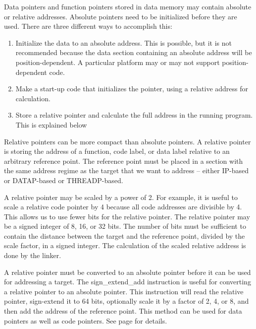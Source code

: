 \documentclass[forwardcom.tex]{subfiles}
\begin{document}
Data pointers and function pointers stored in data memory may contain absolute or relative addresses. 
Absolute pointers need to be initialized before they are used. There are three different ways to accomplish this:
\begin{enumerate}
  \item Initialize the data to an absolute address. This is possible, but it is not recommended because the data section containing an absolute address will be position-dependent. A particular platform may or may not support position-dependent code.
  
  \item Make a start-up code that initializes the pointer, using a relative address for calculation.
        
  \item Store a relative pointer and calculate the full address in the running
        program. This is explained below
  
\end{enumerate}
\vspace{4mm}


Relative pointers can be more compact than absolute pointers. 
A relative pointer is storing the address of a function, code label, or data label relative to an arbitrary reference point. The reference point must be placed in a section with the same address regime as the target that we want to address -- either IP-based or DATAP-based or THREADP-based.
\vv

A relative pointer may be scaled by a power of 2. For example, it is useful to scale a relative code pointer by 4 because all code addresses are divisible by 4. This allows us to use fewer bits for the relative pointer. The relative pointer may be a signed integer of 8, 16, or 32 bits. The number of bits must be sufficient to contain the distance between the target and the reference point, divided by the scale factor, in a signed integer. The calculation of the scaled relative address is done by the linker.
\vv

A relative pointer must be converted to an absolute pointer before it can be used for addressing a target. The sign\_extend\_add instruction is useful for converting a relative pointer to an absolute pointer. This instruction will read the relative pointer, sign-extend it to 64 bits, optionally scale it by a factor of 2, 4, or 8, and then add the address of the reference point. This method can be used for data pointers as well as code pointers. 
See page \pageref{relativeDataPointer} for details.
\vv
\end{document}
